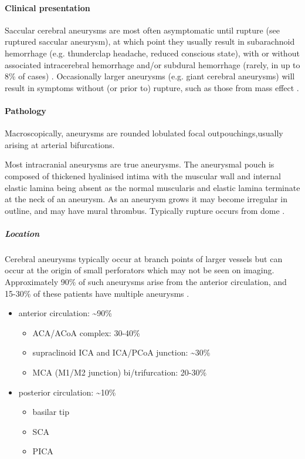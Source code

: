 \paragraph{Clinical presentation}

Saccular cerebral aneurysms are most often asymptomatic until rupture (see ruptured saccular aneurysm), at which point they usually result in subarachnoid hemorrhage (e.g. thunderclap headache, reduced conscious state), with or without associated intracerebral hemorrhage and/or subdural hemorrhage (rarely, in up to 8\% of cases) . Occasionally larger aneurysms (e.g. giant cerebral aneurysms) will result in symptoms without (or prior to) rupture, such as those from mass effect .

\paragraph{Pathology}

Macroscopically, aneurysms are rounded lobulated focal outpouchings,usually arising at arterial bifurcations.

Most intracranial aneurysms are true aneurysms. The aneurysmal pouch is composed of thickened hyalinised intima with the muscular wall and internal elastic lamina being absent as the normal muscularis and elastic lamina terminate at the neck of an aneurysm. As an aneurysm grows it may become irregular in outline, and may have mural thrombus. Typically rupture occurs from dome .

\subparagraph{Location}

Cerebral aneurysms typically occur at branch points of larger vessels but can occur at the origin of small perforators which may not be seen on imaging. Approximately 90\% of such aneurysms arise from the anterior circulation, and 15-30\% of these patients have multiple aneurysms .

\begin{itemize}
	\item
	anterior circulation: \textasciitilde90\%
	
	\begin{itemize}
		\item
		ACA/ACoA complex: 30-40\%
		\item
		supraclinoid ICA and ICA/PCoA junction: \textasciitilde30\%
		\item
		MCA (M1/M2 junction) bi/trifurcation: 20-30\%
	\end{itemize}
	\item
	posterior circulation: \textasciitilde10\%
	
	\begin{itemize}
		\item
		basilar tip
		\item
		SCA
		\item
		PICA
	\end{itemize}
\end{itemize}

